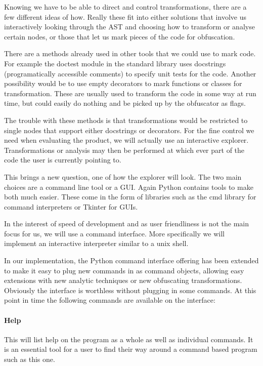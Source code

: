 \documentclass{report}
\begin{document}
Knowing we have to be able to direct and control transformations, there are a few different ideas of how. Really these fit into
either solutions that involve us interactively looking through the AST and choosing how to transform or analyse certain
nodes, or those that let us mark pieces of the code for obfuscation.

There are a methods already used in other tools that we could use to mark code. For example the doctest module in the standard
library uses docstrings (programatically accessible comments) to specify unit tests for the code. Another possibility would
be to use empty decorators to mark functions or classes for transformation. These are usually used to transform the code in
some way at run time, but could easily do nothing and be picked up by the obfuscator as flags.

The trouble with these methods is that transformations would be restricted to single nodes that support either docstrings or
decorators. For the fine control we need when evaluating the product, we will actually use an interactive explorer.
Transformations or analysis may then be performed at which ever part of the code the user is currently pointing to.

This brings a new question, one of how the explorer will look. The two main choices are a command line tool or a GUI. Again
Python contains tools to make both much easier. These come in the form of libraries such as the cmd library \cite{pycmd} for command
interpreters or Tkinter \cite{pytkinter} for GUIs.

In the interest of speed of development and as user friendliness is not the main focus for us, we will use a command interface.
More specifically we will implement an interactive interpreter similar to a unix shell.

In our implementation, the Python command interface offering has been extended to make it easy to plug new commands in as
command objects, allowing easy extensions with new analytic techniques or new obfuscating transformations. Obviously the
interface is worthless without plugging in some commands. At this point in time the following commands are available on the
interface:

\paragraph{Help}

This will list help on the program as a whole as well as individual commands. It is an essential tool for a user to find their way around a
command based program such as this one.
\end{document}
